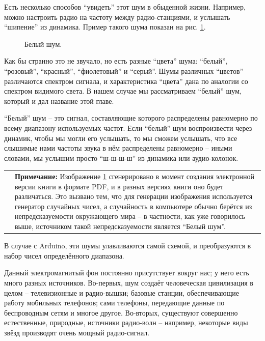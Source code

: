 \documentclass[a4paper,twoside]{book}
\newcommand{\note}[1]{
  \vspace{8pt}
  \begin{tabularx}{\textwidth}{m{1cm} m{9cm}}
    
    & \textbf{Примечание:} #1 \\
  \end{tabularx}
}
\begin{document}
Есть несколько способов ``увидеть'' этот шум в обыденной жизни.  Например, можно
настроить радио на частоту между радио-станциями, и услышать ``шипение'' из
динамика.  Пример такого шума показан на рис. \ref{fig:white-noize}.

\begin{figure}[ht]
  \centering
  \caption{Белый шум.}
  \label{fig:white-noize}
\end{figure}

Как бы странно это не звучало, но есть разные ``цвета'' шума: ``белый'',
``розовый'', ``красный'', ``фиолетовый'' и ``серый''.  Шумы различных ``цветов''
различаются спектром сигнала, и характеристика ``цвета'' дана по аналогии со
спектром видимого света.  В нашем случае мы рассматриваем ``белый'' шум, который
и дал название этой главе.

``Белый'' шум -- это сигнал, составляющие которого распределены равномерно по
всему диапазону используемых частот.  Если ``белый'' шум воспроизвести через
динамик, чтобы мы могли его услышать, то мы сможем услышать, что все слышимые
нами частоты звука в нём распределены равномерно -- иными словами, мы услышим
просто ``ш-ш-ш-ш'' из динамика или аудио-колонок.

\note{Изображение \ref{fig:white-noize} сгенерировано в момент создания
  электронной версии книги в формате PDF, и в разных версиях книги оно будет
  различаться.  Это вызвано тем, что для генерации изображения используется
  генератор случайных чисел, а случайность в компьютере обычно берётся из
  непредсказуемости окружающего мира -- в частности, как уже говорилось выше,
  источником такой непредсказуемости является ``Белый шум''.}

В случае с Arduino, эти шумы улавливаются самой схемой, и преобразуются в набор
чисел определённого диапазона.

Данный электромагнитый фон постоянно присутствует вокруг нас; у него есть много
разных источников.  Во-первых, шум создаёт человеческая цивилизация в целом --
телевизионные и радио-вышки; базовые станции, обеспечивающие работу мобильных
телефонов; сами телефоны, передающие данные по беспроводным сетям и многое
другое.  Во-вторых, существуют совершенно естественные, природные, источники
радио-волн -- например, некоторые виды звёзд производят очень мощный
радио-сигнал.
\end{document}
